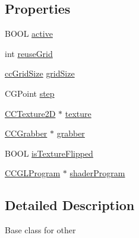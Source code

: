 \subsection*{Properties}
\begin{DoxyCompactItemize}
\item 
B\-O\-O\-L \hyperlink{interface_c_c_grid_base_a1ff789adfb6e068f9bdc460c70916035}{active}
\item 
int \hyperlink{interface_c_c_grid_base_a1a4a6492ed5eeaa7bf33ade7333fc0d5}{reuse\-Grid}
\item 
\hyperlink{cc_types_8h_a66489f5c8efbdb2aa26ecbf9184ec8ea}{cc\-Grid\-Size} \hyperlink{interface_c_c_grid_base_a3b115a5e6c8321f599ca3693dc20f62c}{grid\-Size}
\item 
C\-G\-Point \hyperlink{interface_c_c_grid_base_a2b4025931d481909fb29648726ea4b18}{step}
\item 
\hyperlink{class_c_c_texture2_d}{C\-C\-Texture2\-D} $\ast$ \hyperlink{interface_c_c_grid_base_ab987cc079795423117e6ced0c419a288}{texture}
\item 
\hyperlink{interface_c_c_grabber}{C\-C\-Grabber} $\ast$ \hyperlink{interface_c_c_grid_base_a9947ff1cac4cf470351da177fc1c4a19}{grabber}
\item 
B\-O\-O\-L \hyperlink{interface_c_c_grid_base_a4793cac52a6a5d3aa6ca947efed75115}{is\-Texture\-Flipped}
\item 
\hyperlink{interface_c_c_g_l_program}{C\-C\-G\-L\-Program} $\ast$ \hyperlink{interface_c_c_grid_base_a7d119a5c4877b9cf4762f61843d76da4}{shader\-Program}
\end{DoxyCompactItemize}


\subsection{Detailed Description}
Base class for other 

